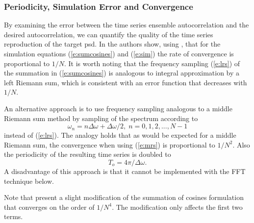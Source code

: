 \documentclass[journal]{IEEEtran}
\begin{document}
\subsubsection{Periodicity, Simulation Error and Convergence}

By examining the error between the time series ensemble autocorrelation and the
desired autocorrelation, we can quantify the quality of the time series reproduction of the target \ac{psd}. In \cite{shinozuka91simulation} the authors show, using \cite{conte17elementary}, that for the simulation equations (\ref{e:sumcosines}) and (\ref{e:sim}) the rate of convergence is proportional to $1/N$. It is worth noting that the frequency sampling (\ref{e:lrs}) of the summation in (\ref{e:sumcosines}) is analogous to integral approximation by a left Riemann sum, which is consistent with an error function that decreases with $1/N$.

An alternative approach is to use frequency sampling analogous to a middle Riemann sum method by sampling of the spectrum according to 
\begin{equation}
  \omega_n = n \Delta \omega + \Delta \omega /2 , \; n=0,1,2,...,N-1
  \label{e:mrs}
\end{equation}
instead of (\ref{e:lrs}).
The analogy holds that as would be expected for a middle Riemann sum, the convergence when using (\ref{e:mrs}) is proportional to $1/N^2$.  Also the periodicity of the resulting time series is doubled to
\begin{equation}
  T_o = 4\pi / \Delta \omega.
  \label{e:to}
\end{equation}
A disadvantage of this approach is that it cannot be implemented with the FFT technique below.

Note that \cite{hu97simulation} present a slight modification of the summation of cosines formulation that converges on the order of $1/N^4$.  The modification only affects the first two terms.
\end{document}
